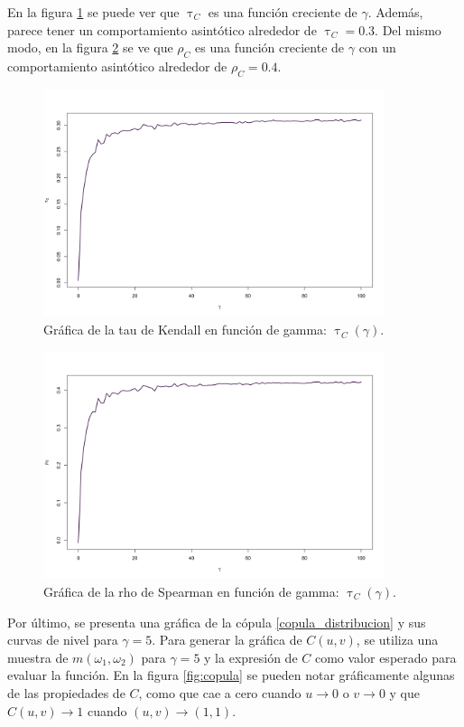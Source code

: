 \documentclass[11pt,a4paper]{article}
\begin{document}
En la figura \ref{fig:kendall_tau} se puede ver que $\uptau_C$ es una función creciente de $\gamma$. Además, parece tener un comportamiento asintótico alrededor de $\uptau_C = 0.3$. Del mismo modo, en la figura \ref{fig:spearman_rho} se ve que $\rho_C$ es una función creciente de $\gamma$ con un comportamiento asintótico alrededor de $\rho_C = 0.4$. 

\begin{figure}[!htb]
\centering\includegraphics[width=10cm]{kendall_tau.png}
\caption{Gráfica de la tau de Kendall en función de gamma: $\uptau_C (\gamma)$.}
\label{fig:kendall_tau}
\end{figure}

\begin{figure}[!htb]
\centering\includegraphics[width=10cm]{spearman_rho.png}
\caption{Gráfica de la rho de Spearman en función de gamma: $\uptau_C (\gamma)$.}
\label{fig:spearman_rho}
\end{figure}

\newpage

Por último, se presenta una gráfica de la cópula \eqref{copula_distribucion} y sus curvas de nivel para $\gamma = 5$. Para generar la gráfica de $C(u, v)$, se utiliza una muestra de $m(\omega_1, \omega_2)$ para $\gamma = 5$ y la expresión de $C$ como valor esperado para evaluar la función. En la figura \ref{fig:copula} se pueden notar gráficamente algunas de las propiedades de $C$, como que cae a cero cuando $u \to 0$ o $v \to 0$ y que $C (u, v) \to 1$ cuando $(u, v) \to (1, 1)$.
\end{document}
